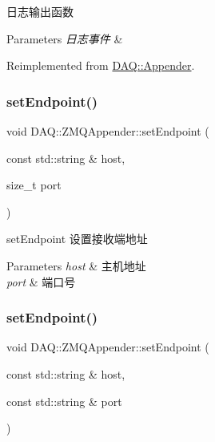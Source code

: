 日志输出函数 


\begin{DoxyParams}{Parameters}
{\em 日志事件} & \\
\hline
\end{DoxyParams}


Reimplemented from \hyperlink{classDAQ_1_1Appender_a49ebbcec4d879ba461080479fa1085aa}{D\+A\+Q\+::\+Appender}.

\mbox{\label{classDAQ_1_1ZMQAppender_a3e872d262ba9a6e9c17c779f73a1c3a3}} 
\subsubsection{\texorpdfstring{set\+Endpoint()}{setEndpoint()}\hspace{0.1cm}{\footnotesize\ttfamily [1/2]}}
{\footnotesize\ttfamily void D\+A\+Q\+::\+Z\+M\+Q\+Appender\+::set\+Endpoint (\begin{DoxyParamCaption}\item[{const std\+::string \&}]{host,  }\item[{size\+\_\+t}]{port }\end{DoxyParamCaption})\hspace{0.3cm}{\ttfamily [inline]}}



set\+Endpoint 设置接收端地址 


\begin{DoxyParams}{Parameters}
{\em host} & 主机地址 \\
\hline
{\em port} & 端口号 \\
\hline
\end{DoxyParams}
\mbox{\label{classDAQ_1_1ZMQAppender_a3eba37ec932d66030bbc1a6f5c751005}} 
\subsubsection{\texorpdfstring{set\+Endpoint()}{setEndpoint()}\hspace{0.1cm}{\footnotesize\ttfamily [2/2]}}
{\footnotesize\ttfamily void D\+A\+Q\+::\+Z\+M\+Q\+Appender\+::set\+Endpoint (\begin{DoxyParamCaption}\item[{const std\+::string \&}]{host,  }\item[{const std\+::string \&}]{port }\end{DoxyParamCaption})\hspace{0.3cm}{\ttfamily [inline]}}



